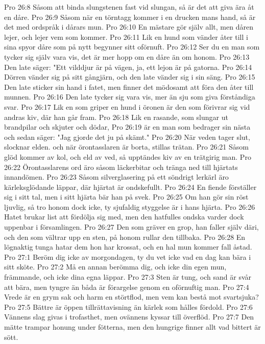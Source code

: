 Pro 26:8  Såsom att binda slungstenen fast vid slungan, så är det att giva ära åt en dåre.
Pro 26:9  Såsom när en törntagg kommer i en drucken mans hand, så är det med ordspråk i dårars mun.
Pro 26:10  En mästare gör själv allt, men dåren lejer, och lejer vem som kommer.
Pro 26:11  Lik en hund som vänder åter till i sina spyor dåre som på nytt begynner sitt oförnuft.
Pro 26:12  Ser du en man som tycker sig själv vara vis, det är mer hopp om en dåre än om honom.
Pro 26:13  Den late säger: "Ett vilddjur är på vägen, ja, ett lejon är på gatorna.
Pro 26:14  Dörren vänder sig på sitt gångjärn, och den late vänder sig i sin säng.
Pro 26:15  Den late sticker sin hand i fatet, men finner det mödosamt att föra den åter till munnen.
Pro 26:16  Den late tycker sig vara vis, mer än sju som giva förståndiga svar.
Pro 26:17  Lik en som griper en hund i öronen är den som förivrar sig vid andras kiv, där han går fram.
Pro 26:18  Lik en rasande, som slungar ut brandpilar och skjuter och dödar,
Pro 26:19  är en man som bedrager sin nästa och sedan säger: "Jag gjorde det ju på skämt."
Pro 26:20  När veden tager slut, slocknar elden. och när örontasslaren är borta, stillas trätan.
Pro 26:21  Såsom glöd kommer av kol, och eld av ved, så upptändes kiv av en trätgirig man.
Pro 26:22  Örontasslarens ord äro såsom läckerbitar och tränga ned till hjärtats innandömen.
Pro 26:23  Såsom silverglasering på ett söndrigt lerkärl äro kärleksglödande läppar, där hjärtat är ondskefullt.
Pro 26:24  En fiende förställer sig i sitt tal, men i sitt hjärta bär han på svek.
Pro 26:25  Om han gör sin röst ljuvlig, så tro honom dock icke, ty sjufaldig styggelse är i hans hjärta.
Pro 26:26  Hatet brukar list att fördölja sig med, men den hatfulles ondska varder dock uppenbar i församlingen.
Pro 26:27  Den som gräver en grop, han faller själv däri, och den som vältrar upp en sten, på honom rullar den tillbaka.
Pro 26:28  En lögnaktig tunga hatar dem hon har krossat, och en hal mun kommer fall åstad.
Pro 27:1  Beröm dig icke av morgondagen, ty du vet icke vad en dag kan bära i sitt sköte.
Pro 27:2  Må en annan berömma dig, och icke din egen mun, främmande, och icke dina egna läppar.
Pro 27:3  Sten är tung, och sand är svår att bära, men tyngre än båda är förargelse genom en oförnuftig man.
Pro 27:4  Vrede är en grym sak och harm en störtflod, men vem kan bestå mot svartsjuka?
Pro 27:5  Bättre är öppen tillrättavisning än kärlek som hålles fördold.
Pro 27:6  Vännens slag givas i trofasthet, men ovännens kyssar till överflöd.
Pro 27:7  Den mätte trampar honung under fötterna, men den hungrige finner allt vad bittert är sött.

